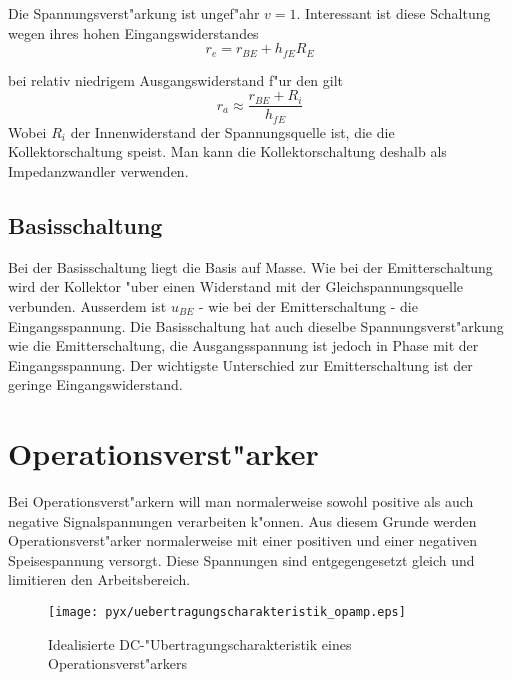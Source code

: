 \documentclass[german, 10pt, a4paper, headsepline]{scrreprt}
\theoremstyle{remark}
\begin{document}
Die Spannungsverst"arkung ist ungef"ahr $v = 1$. Interessant ist diese Schaltung wegen ihres hohen Eingangswiderstandes
\begin{displaymath}
	r_e = r_{BE} + h_{fE} R_E
\end{displaymath}

bei relativ niedrigem Ausgangswiderstand f"ur den gilt
\begin{displaymath}
	r_a \approx \frac{r_{BE}+R_i}{h_{fE}}
\end{displaymath}
Wobei $R_i$ der Innenwiderstand der Spannungsquelle ist, die die Kollektorschaltung speist. Man kann die Kollektorschaltung deshalb als Impedanzwandler verwenden.

\subsection{Basisschaltung}

Bei der Basisschaltung liegt die Basis auf Masse. Wie bei der Emitterschaltung wird der Kollektor "uber einen Widerstand mit der Gleichspannungsquelle verbunden. Ausserdem ist $u_{BE}$ - wie bei der Emitterschaltung - die Eingangsspannung. Die Basisschaltung hat auch dieselbe Spannungsverst"arkung wie die Emitterschaltung, die Ausgangsspannung ist jedoch in Phase mit der Eingangsspannung. Der wichtigste Unterschied zur Emitterschaltung ist der geringe Eingangswiderstand.

\section{Operationsverst"arker}

Bei Operationsverst"arkern will man normalerweise sowohl positive als auch negative Signalspannungen verarbeiten k"onnen. Aus diesem Grunde werden Operationsverst"arker normalerweise mit einer positiven und einer negativen Speisespannung  versorgt. Diese Spannungen sind entgegengesetzt gleich und limitieren den Arbeitsbereich.

\begin{figure}[hbt]
 \begin{center}
	\texttt{[image: pyx/uebertragungscharakteristik\_opamp.eps]}
 \end{center}
 \label{uebertragungscharakteristik_opamp}
 \caption{Idealisierte DC-"Ubertragungscharakteristik eines Operationsverst"arkers}
\end{figure}
\end{document}
